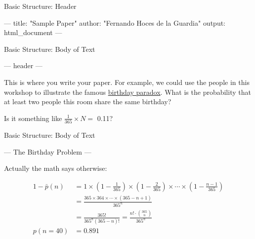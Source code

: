 \documentclass[ignorenonframetext,]{beamer}
\newenvironment{Shaded}{\begin{snugshade}}{\end{snugshade}}
\newcommand{\StringTok}[1]{\textcolor[rgb]{0.31,0.60,0.02}{{#1}}}
\newcommand{\NormalTok}[1]{{#1}}
\begin{document}
\begin{frame}[fragile]{Basic Structure: Header}

\begin{Shaded}
\begin{Highlighting}[]
\NormalTok{---}
\NormalTok{title:}\StringTok{ "Sample Paper"}
\NormalTok{author:}\StringTok{ "Fernando Hoces de la Guardia"}
\NormalTok{output:}\StringTok{ }\NormalTok{html_document}
\NormalTok{---}
\end{Highlighting}
\end{Shaded}

\end{frame}

\begin{frame}[fragile]{Basic Structure: Body of Text}

\begin{Shaded}
\begin{Highlighting}[]
\NormalTok{---}
\NormalTok{header}
\NormalTok{---}
\end{Highlighting}
\end{Shaded}

This is where you write your paper. For example, we could use the people
in this workshop to illustrate the famous
\href{https://en.wikipedia.org/wiki/Birthday_problem}{birthday paradox}.
What is the probability that at least two people this room share the
same birthday?

Is it something like \(\frac{1}{365} \times N =\) 0.11?

\end{frame}

\begin{frame}[fragile]{Basic Structure: Body of Text}

\begin{Shaded}
\begin{Highlighting}[]
\NormalTok{---}
\NormalTok{The Birthday Problem}
\NormalTok{---}
\end{Highlighting}
\end{Shaded}

Actually the math says otherwise:

\begin{align} 
 1 - \bar p(n) &= 1 \times \left(1-\frac{1}{365}\right) \times \left(1-\frac{2}{365}\right) \times \cdots \times \left(1-\frac{n-1}{365}\right) \nonumber  \\  &= \frac{ 365 \times 364 \times \cdots \times (365-n+1) }{ 365^n } \nonumber \\ &= \frac{ 365! }{ 365^n (365-n)!} = \frac{n!\cdot\binom{365}{n}}{365^n}\\
p(n= 40) &= 0.891  \nonumber
\end{align}

\end{frame}
\end{document}

